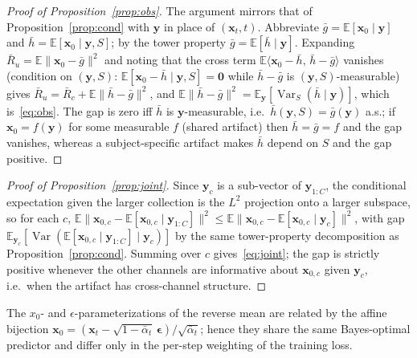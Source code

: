 \begin{proof}[Proof of Proposition~\ref{prop:obs}]
The argument mirrors that of Proposition~\ref{prop:cond} with $\mathbf{y}$ in
place of $(\mathbf{x}_t,t)$. Abbreviate
$\bar{g}=\mathbb{E}[\mathbf{x}_0\mid\mathbf{y}]$ and
$\bar{h}=\mathbb{E}[\mathbf{x}_0\mid\mathbf{y},S]$; by the tower property
$\bar{g}=\mathbb{E}[\bar{h}\mid\mathbf{y}]$. Expanding
$\bar{R}_u=\mathbb{E}\|\mathbf{x}_0-\bar{g}\|^2$ and noting that the cross term
$\mathbb{E}\langle\mathbf{x}_0-\bar{h},\,\bar{h}-\bar{g}\rangle$ vanishes
(condition on $(\mathbf{y},S)$: $\mathbb{E}[\mathbf{x}_0-\bar{h}\mid\mathbf{y},S]=\mathbf{0}$
while $\bar{h}-\bar{g}$ is $(\mathbf{y},S)$-measurable) gives
$\bar{R}_u=\bar{R}_c+\mathbb{E}\|\bar{h}-\bar{g}\|^2$, and
$\mathbb{E}\|\bar{h}-\bar{g}\|^2=\mathbb{E}_{\mathbf{y}}[\operatorname{Var}_S(\bar{h}\mid\mathbf{y})]$,
which is~\eqref{eq:obs}. The gap is zero iff $\bar{h}$ is $\mathbf{y}$-measurable,
i.e.\ $\bar{h}(\mathbf{y},S)=\bar{g}(\mathbf{y})$ a.s.; if $\mathbf{x}_0=f(\mathbf{y})$
for some measurable $f$ (shared artifact) then $\bar{h}=\bar{g}=f$ and the gap
vanishes, whereas a subject-specific artifact makes $\bar{h}$ depend on $S$ and the
gap positive.
\end{proof}

\begin{proof}[Proof of Proposition~\ref{prop:joint}]
Since $\mathbf{y}_c$ is a sub-vector of $\mathbf{y}_{1:C}$, the conditional
expectation given the larger collection is the $L^2$ projection onto a larger
subspace, so for each $c$,
$\mathbb{E}\|\mathbf{x}_{0,c}-\mathbb{E}[\mathbf{x}_{0,c}\mid\mathbf{y}_{1:C}]\|^2\le
\mathbb{E}\|\mathbf{x}_{0,c}-\mathbb{E}[\mathbf{x}_{0,c}\mid\mathbf{y}_c]\|^2$, with
gap $\mathbb{E}_{\mathbf{y}_c}[\operatorname{Var}(\mathbb{E}[\mathbf{x}_{0,c}\mid\mathbf{y}_{1:C}]\mid\mathbf{y}_c)]$
by the same tower-property decomposition as Proposition~\ref{prop:cond}. Summing
over $c$ gives~\eqref{eq:joint}; the gap is strictly positive whenever the other
channels are informative about $\mathbf{x}_{0,c}$ given $\mathbf{y}_c$, i.e.\ when
the artifact has cross-channel structure.
\end{proof}

\begin{lemma}
\label{lem:x0eps}
The $x_0$- and $\epsilon$-parameterizations of the reverse mean are related by the
affine bijection
$\mathbf{x}_0=(\mathbf{x}_t-\sqrt{1-\bar{\alpha}_t}\,\boldsymbol{\epsilon})/\sqrt{\bar{\alpha}_t}$;
hence they share the same Bayes-optimal predictor and differ only in the per-step
weighting of the training loss.
\end{lemma}

